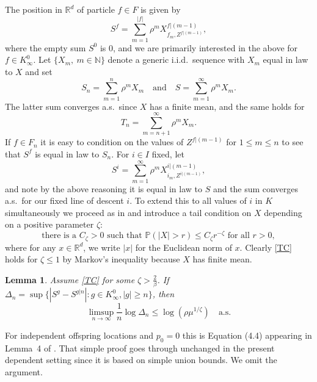 \documentclass[12pt]{article}
\numberwithin{theorem}{section}
\newtheorem{lemma}[theorem]{Lemma}
\theoremstyle{def}
\numberwithin{equation}{section}
\renewcommand{\P}{\mathbb{P}}
\newcommand{\R}{\mathbb{R}}
\newcommand{\N}{\mathbb{N}}
\begin{document}
The position in $\R^d$ of particle $f\in F$ is given by
\begin{equation}\label{Sfdefn}S^f=\sum_{m=1}^{|f|} \rho^mX^{f|(m-1)}_{f_m,Z^{f|(m-1)}},\end{equation}
where the empty sum $S^0$ is $0$, and we are primarily interested in the above for $f\in K_\infty^0$. 
Let $\{X_m, \ m\in\N\}$ denote a generic i.i.d.\ sequence with $X_m$ equal in law to $X$ and set 
\begin{equation}\label{SSndef} S_n=\sum_{m=1}^n\rho^mX_m \quad \text{and} \quad S=\sum_{m=1}^\infty \rho^m X_m.
\end{equation}
The latter sum converges a.s.\ since $X$ has a finite mean, and the same holds for 
\[T_n=\sum_{m=n+1}^\infty \rho^mX_m.\]
If $f\in F_n$ it is easy to condition on the values of $Z^{f|(m-1)}$ for $1\le m\le n$ to see that $S^f$ is equal in law to $S_n$.  For $i\in I$ fixed, let 
\begin{equation}\label{Sidefn}S^i=\sum_{m=1}^\infty\rho^mX^{i|(m-1)}_{i_m,Z^{i|(m-1)}},\end{equation}
and note by the above reasoning it is equal in law to $S$ and the sum converges a.s.\ for our fixed line of descent $i$. To extend this to all values of $i$ in $K$ simultaneously we proceed as in \cite{ADHP} and introduce a tail condition on $X$ depending on a positive parameter ${\zeta}$:
\begin{equation}\label{TC}\tag*{$(TC)_\zeta$}
\text{there is a }C_{\zeta}>0\text{ such that }\P(|X|>r)\le C_{\zeta} r^{-{\zeta}}\text{ for all }r>0,
\end{equation}
where for any $x\in \R^d$, we write $|x|$ for the Euclidean norm of $x$.
Clearly \ref{TC} holds for ${\zeta}\le 1$ by Markov's inequality because $X$ has finite mean.
\begin{lemma}\label{CauchyC} Assume \ref{TC} for some $\zeta>\frac{2}{\beta}$. If $\Delta_n=\sup\{|S^g-S^{g|n}|:g\in K^0_\infty, |g|\ge n\}$, then 
\begin{equation*}
	\limsup_{n\to\infty} \frac{1}{n}\log \Delta_n\le \log(\rho\mu^{1/{\zeta}})\quad  \text{a.s.} 
\end{equation*}
\end{lemma}
\noindent For independent offspring locations and $p_0=0$ this is Equation (4.4) appearing in Lemma~4 of \cite{ADHP}. 
That simple proof goes through unchanged in the present dependent setting since it is based on simple union bounds.
We omit the argument.
\end{document}
